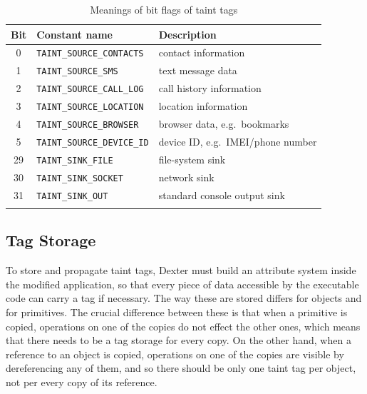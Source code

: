 \documentclass[12pt,twoside,notitlepage]{report}
\begin{document}
\begin{table}
	\begin{center}
	\begin{tabular}{|c|l|l|}
		\firsthline
		\textbf{Bit} & \textbf{Constant name}        & \textbf{Description} \\
		\hline
		0            & \verb$TAINT_SOURCE_CONTACTS$  & contact information \\
		1            & \verb$TAINT_SOURCE_SMS$       & text message data \\
		2            & \verb$TAINT_SOURCE_CALL_LOG$  & call history information \\
		3            & \verb$TAINT_SOURCE_LOCATION$  & location information \\
		4            & \verb$TAINT_SOURCE_BROWSER$   & browser data, e.g.\ bookmarks \\
		5            & \verb$TAINT_SOURCE_DEVICE_ID$ & device ID, e.g.\ IMEI/phone number \\
		\hline
		29           & \verb$TAINT_SINK_FILE$        & file-system sink \\
		30           & \verb$TAINT_SINK_SOCKET$      & network sink \\
		31           & \verb$TAINT_SINK_OUT$         & standard console output sink \\
		\lasthline
	\end{tabular}
	\end{center}
	\caption{Meanings of bit flags of taint tags}
	\label{table:TaintTagStorage_BitMeaning}
\end{table}

\subsection{Tag Storage}

To store and propagate taint tags, Dexter must build an attribute system inside the modified application, so that every piece of data accessible by the executable code can carry a tag if necessary. The way these are stored differs for objects and for primitives. The crucial difference between these is that when a primitive is copied, operations on one of the copies do not effect the other ones, which means that there needs to be a tag storage for every copy. On the other hand, when a reference to an object is copied, operations on one of the copies are visible by dereferencing any of them, and so there should be only one taint tag per object, not per every copy of its reference. 
\end{document}
